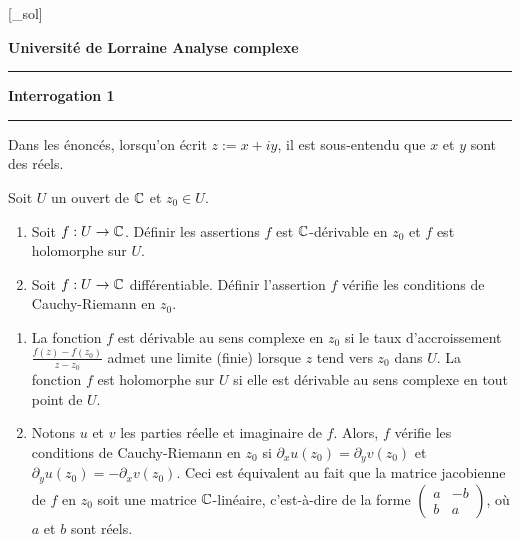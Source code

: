 








[\jobname_sol]



\newpage
\noindent \textbf{\textsf{Université de Lorraine \hfill Analyse complexe}}
\smallskip
\noindent\rule{\textwidth}{2pt}
\begin{center}
{\huge \textbf{Interrogation 1}}
\end{center}
\noindent\rule{\textwidth}{2pt}

Dans les énoncés, lorsqu'on écrit $z:=x+iy$, il est sous-entendu que $x$ et $y$ sont des réels.


\begin{exo}
Soit $U$ un ouvert de $\mathbb{C}$ et $z_0\in U$.
\begin{enumerate}
\item Soit $f : U\to \mathbb{C}$. Définir les assertions \og $f$ est $\mathbb{C}$-dérivable en $z_0$ \fg{} et \og $f$ est holomorphe sur $U$.\fg
\item Soit $f : U\to \mathbb{C}$ différentiable.  Définir l'assertion \og $f$ vérifie les conditions de Cauchy-Riemann en $z_0$.\fg{}
\end{enumerate}
\begin{sol}
\begin{enumerate}
\item La fonction $f$ est dérivable au sens complexe en $z_0$ si le taux d'accroissement $\frac{f(z)-f(z_0)}{z-z_0}$ admet une limite (finie) lorsque $z$ tend vers $z_0$ dans $U$. 
La fonction $f$ est holomorphe sur $U$ si elle est dérivable au sens complexe en tout point de $U$.
\item Notons $u$ et $v$ les parties réelle et imaginaire de $f$.  Alors, $f$ vérifie les conditions de Cauchy-Riemann en $z_0$ si $\partial_x u (z_0) = \partial_y v (z_0)$ et $\partial_y u (z_0) = -\partial_x v(z_0)$. Ceci est équivalent au fait que la matrice jacobienne de $f$ en $z_0$ soit une matrice $\mathbb{C}$-linéaire, c'est-à-dire de la forme $\begin{pmatrix}
a& -b \\ b & a
\end{pmatrix}$, où $a$ et $b$ sont réels.
\end{enumerate}
\end{sol}

\end{exo}

